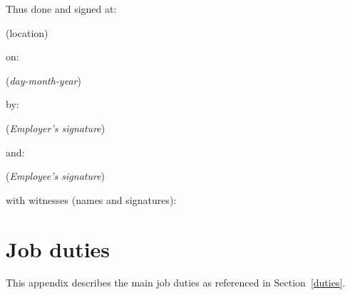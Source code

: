 \documentclass[a4paper,11pt]{article}
\begin{document}
\begin{center}
  Thus done and signed at:

  \vspace{0.5cm}


  (location)

  \vspace{0.5cm}

  on:

  \vspace{0.5cm}


  (\textit{day-month-year})

  \vspace{0.5cm}

  by:

  \vspace{0.5cm}


  (\textit{Employer's signature})

  \vspace{0.5cm}

  and:

  \vspace{0.5cm}


  (\textit{Employee's signature})

  \vspace{0.5cm}

  with witnesses (names and signatures):

  \vspace{0.5cm}


  \vspace{0.5cm}


\end{center}

\pagebreak %

\appendix

\section{Job duties}
\label{job-duties}

This appendix describes the main job duties as referenced in
Section~\ref{duties}.
\end{document}
